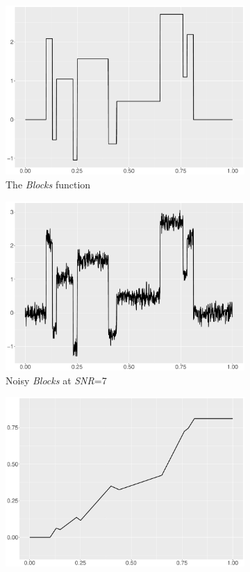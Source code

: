 \begin{figure}
    \centering
    \begin{subfigure}{0.45\textwidth}
    \centering
    \includegraphics[width=\linewidth,height=0.45\textwidth]{Chapters/02TractorSplineTheory/plot/ggplot/ggBlocks.pdf}
    \caption{The \textit{Blocks} function}
    \end{subfigure}%
    \begin{subfigure}{0.45\textwidth}
    \centering
    \includegraphics[width=\linewidth,height=0.45\textwidth]{Chapters/02TractorSplineTheory/plot/ggplot/ggBlocksNoise.pdf}
    \caption{Noisy \textit{Blocks} at \textit{SNR}=7}
    \end{subfigure}
    \begin{subfigure}{0.45\textwidth}
    \centering
    \includegraphics[width=\linewidth,height=0.45\textwidth]{Chapters/02TractorSplineTheory/plot/ggplot/ggBlocksPosition.pdf}

\end{subfigure}
\end{figure}

